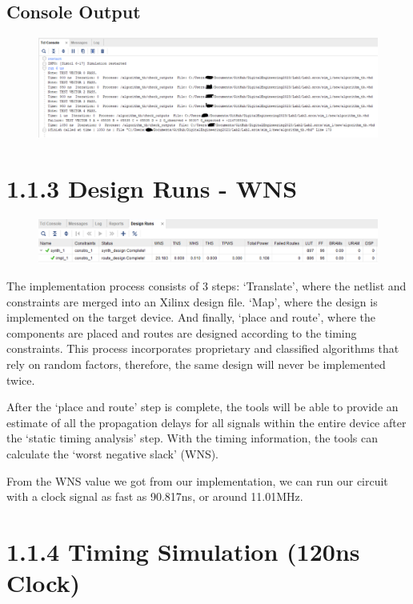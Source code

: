 \documentclass[11pt]{report}
\begin{document}
\subsection*{Console Output}
\begin{figure}[H]
    \includegraphics[width=\columnwidth]{Reports/Lab2/Waveforms/120ns_behavioural-console.png}
\end{figure}


\section*{1.1.3 Design Runs - WNS}
\begin{figure}[H]
    \includegraphics[width=\columnwidth]{Reports/Lab2/Waveforms/design_runs-WNS.png}
\end{figure}
The implementation process consists of 3 steps: `Translate', where the netlist and constraints are merged into an Xilinx design file. `Map', where the design is implemented on the target device. And finally, `place and route', where the components are placed and routes are designed according to the timing constraints. This process incorporates proprietary and classified algorithms that rely on random factors, therefore, the same design will never be implemented twice.

After the `place and route' step is complete, the tools will be able to provide an estimate of all the propagation delays for all signals within the entire device after the `static timing analysis' step. With the timing information, the tools can calculate the `worst negative slack' (WNS).

From the WNS value we got from our implementation, we can run our circuit with a clock signal as fast as 90.817ns, or around 11.01MHz.


\section*{1.1.4 Timing Simulation (120ns Clock)}
\end{document}
